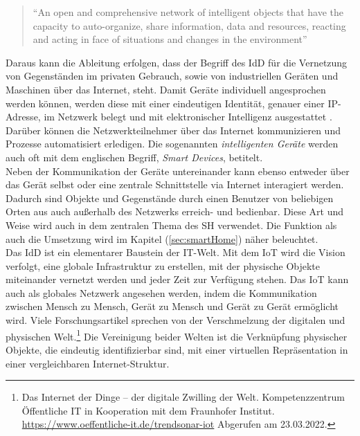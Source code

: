     \pagebreak
    \begin{quote}
        “An open and comprehensive network of intelligent objects that have the capacity to auto-organize, share information, data 
        and resources, reacting and acting in face of situations and changes in the environment” \cite{Madakam2015}
    \end{quote}
    Daraus kann die Ableitung erfolgen, dass der Begriff des \acl{IdD} für die Vernetzung von Gegenständen im privaten Gebrauch, sowie 
    von industriellen Geräten und Maschinen über das Internet, steht. Damit Geräte individuell angesprochen werden können, werden diese 
    mit einer eindeutigen Identität, genauer einer \ac{IP}-Adresse, im Netzwerk belegt und mit elektronischer Intelligenz ausgestattet \cite{bigdatainsider2016}.
    Darüber können die Netzwerkteilnehmer über das Internet kommunizieren und Prozesse automatisiert erledigen. Die sogenannten 
    \textit{intelligenten Geräte} werden auch oft mit dem englischen Begriff, \textit{Smart Devices}, betitelt. 
    \\
    \linebreak
    Neben der Kommunikation der Geräte untereinander kann ebenso entweder über das Gerät selbst oder eine zentrale 
    Schnittstelle via Internet interagiert werden. Dadurch sind Objekte und Gegenstände durch einen Benutzer von beliebigen Orten aus  
    auch außerhalb des Netzwerks erreich- und bedienbar. Diese Art und Weise wird auch in dem zentralen Thema des 
    \acl{SH} verwendet. Die Funktion als auch die Umsetzung wird im Kapitel (\ref{sec:smartHome}) näher beleuchtet.
    \\
    \linebreak
    Das \acl{IdD} ist ein elementarer Baustein der \acs{IT}-Welt. Mit dem \acs{IoT} wird die Vision verfolgt, eine globale 
    Infrastruktur zu erstellen, mit der physische Objekte miteinander vernetzt werden und jeder Zeit zur Verfügung stehen. Das \acl{IoT} 
    kann auch als globales Netzwerk angesehen werden, indem die Kommunikation zwischen Mensch zu Mensch, Gerät zu Mensch und Gerät zu 
    Gerät ermöglicht wird. Viele Forschungsartikel sprechen von der Verschmelzung der digitalen und 
    physischen Welt.\footnote{Das Internet der Dinge – der digitale Zwilling der Welt. Kompetenzzentrum Öffentliche IT in Kooperation mit dem Fraunhofer Institut. \url{https://www.oeffentliche-it.de/trendsonar-iot} Abgerufen am 23.03.2022.} 
    Die Vereinigung beider Welten ist die Verknüpfung physischer Objekte, die eindeutig identifizierbar sind, mit einer virtuellen 
    Repräsentation in einer vergleichbaren Internet-Struktur. 
